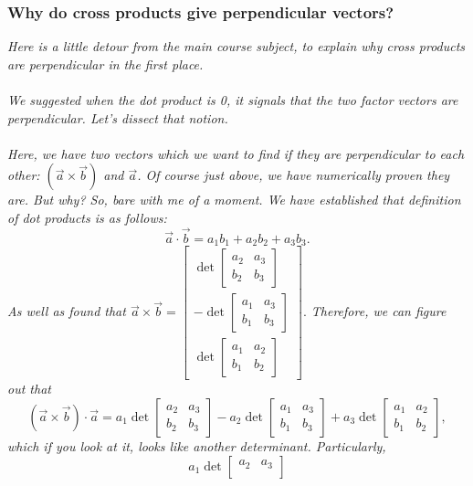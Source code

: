 \documentclass[addpoints]{exam}
\begin{document}
\subsubsection{
Why do cross products give perpendicular vectors?
} \label{sssec:1.6.3}
\textit{
Here is a little detour from the main course subject, to explain why cross products are perpendicular in the first place.\\\\
We suggested when the dot product is 0, it signals that the two factor vectors are perpendicular. Let's dissect that notion.\\\\
Here, we have two vectors which we want to find if they are perpendicular to each other: $(\vec{a}\times\vec{b})$ and $\vec{a}$. Of course just above, we have numerically proven they are. But why? So, bare with me of a moment. We have established that definition of dot products is as follows:\[\vec{a}\cdot\vec{b}=a_1b_1+a_2b_2+a_3b_3.\]As well as found that $\vec{a}\times\vec{b}=\begin{bmatrix}
    \det\begin{bmatrix}
    a_2&a_3\\
    b_2&b_3
\end{bmatrix}\\
    -\det\begin{bmatrix}
    a_1&a_3\\
    b_1&b_3
\end{bmatrix}\\
    \det\begin{bmatrix}
    a_1&a_2\\
    b_1&b_2
\end{bmatrix}
\end{bmatrix}.$ Therefore, we can figure out that
\[(\vec{a}\times\vec{b})\cdot\vec{a}=
a_1\det\begin{bmatrix}
    a_2&a_3\\
    b_2&b_3
\end{bmatrix} - 
a_2\det\begin{bmatrix}
    a_1&a_3\\
    b_1&b_3
\end{bmatrix}+
a_3\det\begin{bmatrix}
    a_1&a_2\\
    b_1&b_2
\end{bmatrix},
\]
which if you look at it, looks like another determinant. Particularly, 
\[
a_1\det\begin{bmatrix}
    a_2&a_3\\

\end{bmatrix}\]}
\end{document}
